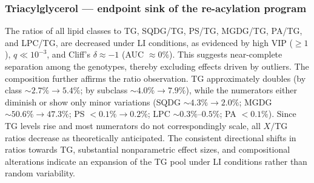 \documentclass[10pt,letterpaper]{article}
\begin{document}
\begin{itemize}
\subsubsection*{Triacylglycerol — endpoint sink of the re-acylation program}
The ratios of all lipid classes to TG, SQDG/TG, PS/TG, MGDG/TG, PA/TG, and LPC/TG, are decreased under LI conditions, as evidenced by high VIP ($\geq 1$), $q \ll 10^{-3}$, and Cliff's $\delta \approx -1$ (AUC $\approx 0\%$). This suggests near-complete separation among the genotypes, thereby excluding effects driven by outliers. The composition further affirms the ratio observation. TG approximately doubles (by class $\sim 2.7\% \rightarrow 5.4\%$; by subclass $\sim 4.0\% \rightarrow 7.9\%$), while the numerators either diminish or show only minor variations (SQDG $\sim 4.3\% \rightarrow 2.0\%$; MGDG $\sim 50.6\% \rightarrow 47.3\%$; PS $<0.1\% \rightarrow 0.2\%$; LPC $\sim 0.3\%$–$0.5\%$; PA $<0.1\%$). Since TG levels rise and most numerators do not correspondingly scale, all $X/$TG ratios decrease as theoretically anticipated. The consistent directional shifts in ratios towards TG, substantial nonparametric effect sizes, and compositional alterations indicate an expansion of the TG pool under LI conditions rather than random variability.



\end{itemize}
\end{document}
